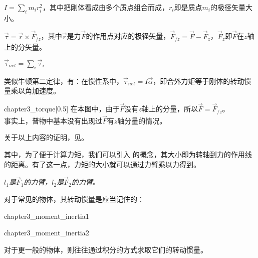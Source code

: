 \begin{Itemize}
    \item {} $\displaystyle I=\sum_{i}m_ir_i^2$，其中把刚体看成由多个质点组合而成，$r_i$即是质点$m_i$的极径矢量大小。

    \item {} $\vec{\tau}=\vec{r}\times\vec{F}_{/z}$，其中$\vec{r}$是力$\vec{F}$的作用点对应的极径矢量，$\vec{F}_{/z}=\vec{F}-\vec{F}_z$，$\vec{F}_z$即$\vec{F}$在$z$轴上的分矢量\footnotemark。
    \item {} $\displaystyle\vec{\tau}_{net}=\sum_{i}\vec{\tau}_i$
    \item 类似牛顿第二定律，有：在惯性系中，$\vec{\tau}_{net}=I\vec{\alpha}$，即合外力矩等于刚体的转动惯量乘以角加速度。
\end{Itemize}
\begin{singlefigure}[力矩示意图]{chapter3_torque}[0.5]
    在本图中，由于$\vec{F}$没有$z$轴上的分量，所以$\vec{F}=\vec{F}_{/z}$。\\
    事实上，普物中基本没有出现过$\vec{F}$有$z$轴分量的情况。
\end{singlefigure}
关于以上内容的证明，见。

其中，为了便于计算力矩，我们可以引入  的概念，其大小即为转轴到力的作用线的距离。有了这一点，力矩的大小就可以通过力臂乘以力得到。
\begin{center}
    \em $l_1$是$\vec{F}_1$的力臂，$l_2$是$\vec{F}_2$的力臂。
\end{center}

对于常见的物体，其转动惯量是应当记住的：
\begin{singlefigure}{chapter3_moment_inertia1}
\end{singlefigure}
\vspace*{-2ex}
\begin{singlefigure}[常见物体的转动惯量]{chapter3_moment_inertia2}
\end{singlefigure}
对于更一般的物体，则往往通过积分的方式求取它们的转动惯量。
